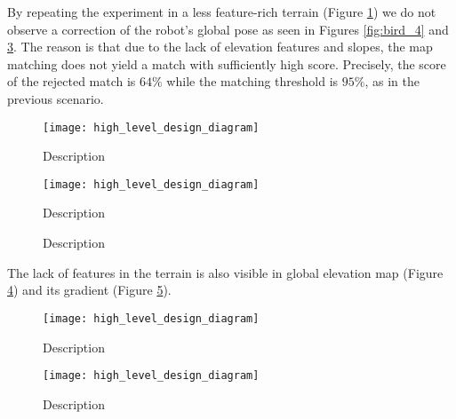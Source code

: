 By repeating the experiment in a less feature-rich terrain
(Figure \ref{fig:terrain_4}) we do not observe a correction of the
robot's global pose as seen in Figures \ref{fig:bird_4} and
\ref{fig:pose_correction_error_2}.
The reason is that due to the lack of elevation features and slopes,
the map matching does not yield a match with sufficiently high score.
Precisely, the score of the rejected match is $64\%$ while the matching
threshold is $95\%$, as in the previous scenario.

\begin{figure}
    \centering
    \texttt{[image: high\_level\_design\_diagram]}
    \caption[Name]{
        Description
    }
    \label{fig:terrain_4}
\end{figure}

\begin{figure}
    \centering
    \texttt{[image: high\_level\_design\_diagram]}
    \caption[Name]{
        Description
    }
    \label{fig:bird_3}
\end{figure}

\begin{figure}
    \centering
    
    \caption[Name]{
        Description
    }
    \label{fig:pose_correction_error_2}
\end{figure}

The lack of features in the terrain is also visible in global
elevation map (Figure \ref{fig:global_elevation_map_2}) and its gradient
(Figure \ref{fig:global_gradient_map_2}).

\begin{figure}
    \centering
    \texttt{[image: high\_level\_design\_diagram]}
    \caption[Name]{
        Description
    }
    \label{fig:global_elevation_map_2}
\end{figure}

\begin{figure}
    \centering
    \texttt{[image: high\_level\_design\_diagram]}
    \caption[Name]{
        Description
    }
    \label{fig:global_gradient_map_2}
\end{figure}

